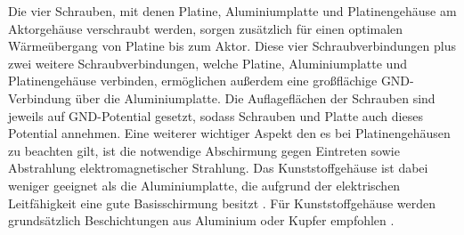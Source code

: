 Die vier Schrauben, mit denen Platine, Aluminiumplatte und Platinengehäuse am Aktorgehäuse verschraubt werden, sorgen zusätzlich für einen optimalen Wärmeübergang von Platine bis zum Aktor. Diese vier Schraubverbindungen plus zwei weitere Schraubverbindungen, welche Platine, Aluminiumplatte und Platinengehäuse verbinden, ermöglichen außerdem eine großflächige GND-Verbindung über die Aluminiumplatte. Die Auflageflächen der Schrauben sind jeweils auf GND-Potential gesetzt, sodass Schrauben und Platte auch dieses Potential annehmen.
Eine weiterer wichtiger Aspekt den es bei Platinengehäusen zu beachten gilt, ist die notwendige Abschirmung gegen Eintreten sowie Abstrahlung elektromagnetischer Strahlung. Das Kunststoffgehäuse ist dabei weniger geeignet als die Aluminiumplatte, die aufgrund der elektrischen Leitfähigkeit eine gute Basisschirmung besitzt \cite{bopla}. Für Kunststoffgehäuse werden grundsätzlich Beschichtungen aus Aluminium oder Kupfer empfohlen \cite{Gwinner2006}.

